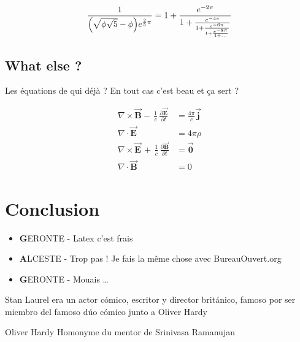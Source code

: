 \documentclass[twocolumn,a4paper]{IEEEtranfr}
\begin{document}
\begin{equation}
  \frac{1}{\Bigl(\sqrt{\phi \sqrt{5}}-\phi\Bigr) e^{\frac25 \pi}} =
  1+\frac{e^{-2\pi}} {1+\frac{e^{-4\pi}} {1+\frac{e^{-6\pi}}
  {1+\frac{e^{-8\pi}} {1+\ldots} } } }
\end{equation}

\subsection{What else ? }

Les équations de qui déjà ? En tout cas c'est beau et ça sert ?

\begin{equation}
\begin{aligned}
    \nabla \times \vec{\mathbf{B}} -\, \frac1c\,
    \frac{\partial\vec{\mathbf{E}}}{\partial t} & = \frac{4\pi}{c}\vec{\mathbf{j}} \\  
    \nabla \cdot \vec{\mathbf{E}} & = 4 \pi \rho \\
    \nabla \times \vec{\mathbf{E}}\, +\, \frac1c\,
    \frac{\partial\vec{\mathbf{B}}}{\partial t} & = \vec{\mathbf{0}} \\
    \nabla \cdot \vec{\mathbf{B}} & = 0
\end{aligned}
\end{equation}

\section{Conclusion}
\begin{itemize}
  \item {\textbf GERONTE} - Latex c'est frais
  \item {\textbf ALCESTE} - Trop pas  ! Je fais la même chose avec BureauOuvert.org
  \item {\textbf GERONTE} - Mouais \dots
\end{itemize}
%
%

%


{}
\begin{IEEEbiography}
{Stan Laurel } era un actor cómico, escritor y director británico,
famoso por ser miembro del famoso dúo cómico junto a Oliver Hardy 

\end{IEEEbiography}

\begin{IEEEbiography}
{Oliver Hardy} Homonyme du mentor de Srinivasa Ramanujan
\end{IEEEbiography}
\end{document}
